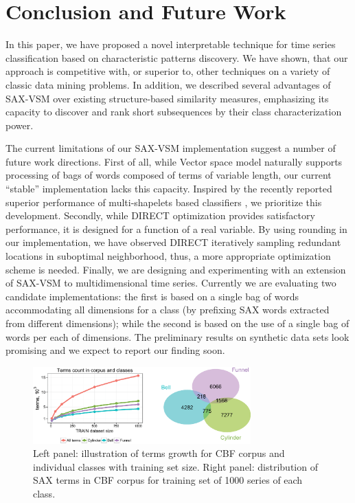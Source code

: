 \documentclass[conference]{IEEEtran}
\newcommand{\myfigureshrinker}{\vspace{0.05cm}}
\begin{document}
\section{Conclusion and Future Work} \label{conclusion}
In this paper, we have proposed a novel interpretable technique for time series classification
based on characteristic patterns discovery. We have shown, that our approach is competitive with, 
or superior to, other techniques on a variety of classic data mining problems. In addition, 
we described several advantages of SAX-VSM over existing structure-based similarity measures,
emphasizing its capacity to discover and rank short subsequences by their class characterization
power.

The current limitations of our SAX-VSM implementation suggest a number of future work directions. 
First of all, while Vector space model naturally supports processing of bags of words composed 
of terms of variable length, our current ``stable'' implementation lacks this capacity.
Inspired by the recently reported superior performance of multi-shapelets based classifiers
\cite{bagnal}, we prioritize this development.
Secondly, while DIRECT optimization provides satisfactory performance, it is designed for a 
function of a real variable. By using rounding in our implementation, we have observed DIRECT 
iteratively sampling redundant locations in suboptimal neighborhood, thus, a more appropriate 
optimization scheme is needed.
Finally, we are designing and experimenting with an extension of SAX-VSM to multidimensional time
series. Currently we are evaluating two candidate implementations: the first is based on a
single bag of words accommodating all dimensions for a class (by prefixing SAX words extracted from
different dimensions); while the second is based on the use of a single bag of words per each of
dimensions. The preliminary results on synthetic data sets look promising and we expect to report 
our finding soon.

\begin{figure}[t]
   \myfigureshrinker
   \centering
   \includegraphics[width=84mm]{figures/Venn.eps}
   \caption{Left panel: illustration of terms growth for CBF corpus and individual classes with 
   training set size. Right panel: distribution of SAX terms in CBF corpus for training set of 
   1000 series of each class.}
   \label{fig:venn}
\end{figure}
\end{document}
